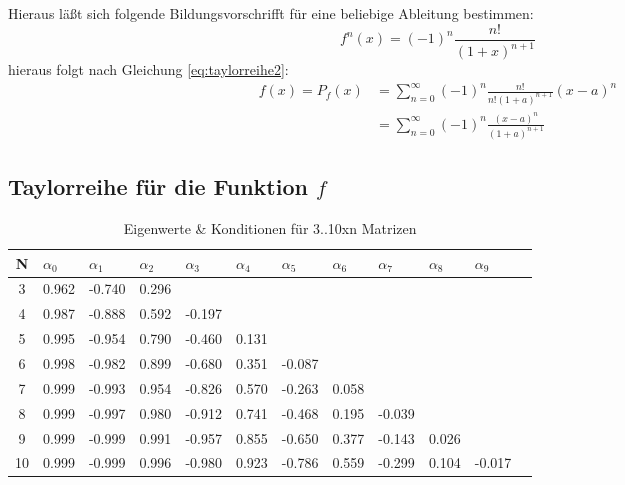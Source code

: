 \documentclass{beamer}
\begin{document}
  \begin{frame}
    Hieraus läßt sich folgende Bildungsvorschrifft für eine beliebige Ableitung bestimmen:
    \begin{equation}
        f^n\left(x\right) = \left(-1\right)^n \frac{n!}{\left(1+x\right)^{n+1}}
    \end{equation}
    hieraus folgt nach Gleichung \ref{eq:taylorreihe2}:
    \begin{align}
        f\left(x\right)  =  P_f\left(x\right) 
                        &= \sum_{n=0}^{\infty} \left(-1\right)^n
                            \frac{n!}{n!\left(1+a\right)^{n+1}}\left(x-a\right)^n\\
                        &=  \sum_{n=0}^{\infty} \left(-1\right)^n
                            \frac{\left(x-a\right)^n}{\left(1+a\right)^{n+1}}
    \end{align}
  \end{frame}
    
  \subsection{Taylorreihe für die Funktion $f$}
  \begin{frame}
    \centering    
    \begin{table}[htbp]
    \tiny   
    \begin{tabularx}{\textwidth}{|c|X|X|X|X|X|X|X|X|X|X|X|}
        \hline    
        N & $\alpha_0$&$\alpha_1$&$\alpha_2$&$\alpha_3$&$\alpha_4$&$\alpha_5$&$\alpha_6$&$\alpha_7$&$\alpha_8$&$\alpha_9$\\\hline
        3 & 0.962 & -0.740 & 0.296 &&&&&&& \\\hline
        4 & 0.987 & -0.888 & 0.592 & -0.197 &&&&&& \\\hline
        5 & 0.995 & -0.954 & 0.790 & -0.460 & 0.131 &&&&& \\\hline
        6 & 0.998 & -0.982 & 0.899 & -0.680 & 0.351 & -0.087 &&&& \\\hline
        7 & 0.999 & -0.993 & 0.954 & -0.826 & 0.570 & -0.263 & 0.058 &&& \\\hline
        8 & 0.999 & -0.997 & 0.980 & -0.912 & 0.741 & -0.468 & 0.195 & -0.039 && \\\hline
        9 & 0.999 & -0.999 & 0.991 & -0.957 & 0.855 & -0.650 & 0.377 & -0.143 & 0.026 & \\\hline
        10& 0.999 & -0.999 & 0.996 & -0.980 & 0.923 & -0.786 & 0.559 & -0.299 & 0.104 & -0.017 \\\hline
    \end{tabularx}
    \caption{Eigenwerte \& Konditionen für 3..10xn Matrizen \label{tab:task3}}      
    \end{table}
  \end{frame}
  
\end{document}
